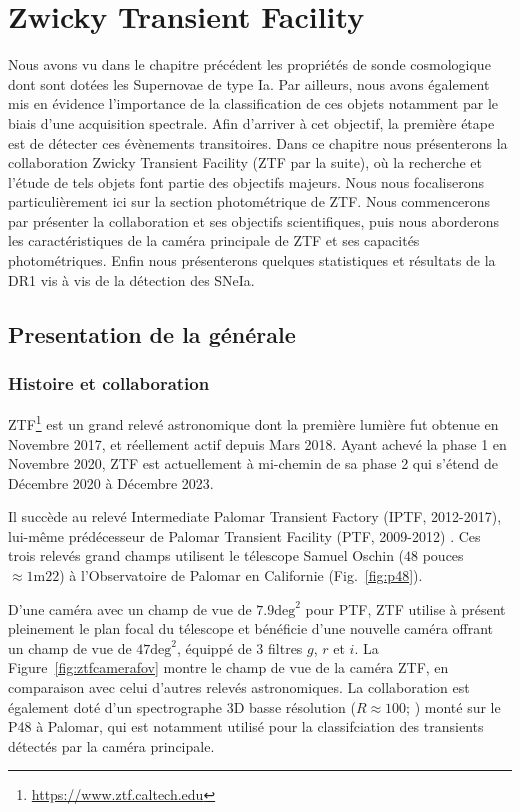 \documentclass[../main/main.tex]{subfiles}
\begin{document}
\setcounter{chapter}{1}
\chapter{Zwicky Transient Facility}\label{ch:ztf}

\minitoc
\vspace{2cm}
Nous avons vu dans le chapitre précédent les propriétés
de sonde
cosmologique dont sont dotées les Supernovae de type Ia. Par
ailleurs, nous avons également mis en évidence l'importance de la
classification de ces objets notamment par le biais d'une acquisition
spectrale. Afin d'arriver à cet objectif, la première étape est de
détecter ces évènements transitoires. Dans ce chapitre nous présenterons
la collaboration Zwicky Transient Facility (ZTF par la suite), où la recherche et
l'étude de tels objets font partie des objectifs majeurs. Nous nous
focaliserons particulièrement ici sur la section photométrique de
ZTF. Nous commencerons par présenter la collaboration et ses objectifs
scientifiques, puis nous aborderons les caractéristiques de la caméra principale de ZTF et ses capacités
photométriques. Enfin nous présenterons quelques statistiques et résultats
de la DR1 vis à vis de la détection des SNeIa.
\newpage
\section{Presentation de la générale}
\label{sec:ztfcollab}


\subsection{Histoire et collaboration}

ZTF\footnote{\url{https://www.ztf.caltech.edu}} \citep{GrahamZTF2019,BellmZTF2019}  est un grand relevé astronomique dont la première lumière fut
obtenue en Novembre 2017, et réellement actif depuis Mars
2018. Ayant achevé la phase 1 en Novembre 2020, ZTF est actuellement à
mi-chemin de sa phase 2 qui s'étend de Décembre 2020 à Décembre 2023.

Il succède au relevé Intermediate Palomar Transient Factory (IPTF, 2012-2017),
lui-même prédécesseur de Palomar Transient Facility (PTF, 2009-2012)
\citep{RauPTF2009,LawPTF2009}. Ces trois relevés grand
champs utilisent le télescope Samuel
Oschin ($48$ pouces $\approx 1\text{m}22$) à l'Observatoire de Palomar en
Californie (Fig.~\ref{fig:p48}).

D'une caméra avec un champ de vue de $7.9 \text{deg}^{2}$
pour PTF, ZTF utilise à présent pleinement le plan focal du télescope et
bénéficie d'une nouvelle caméra offrant un champ de vue de $47
\text{deg}^{2}$, équippé de 3 filtres $g$, $r$ et $i$. La
Figure~\ref{fig:ztfcamerafov} montre le champ de vue de la caméra ZTF,
en comparaison avec celui d'autres relevés astronomiques. La collaboration est également doté d'un spectrographe
3D basse résolution ($R\approx100$; \citet{SEDM18}) monté sur le P48 à
Palomar, qui est notamment
utilisé pour la classifciation des transients détectés par la caméra principale.
\end{document}
